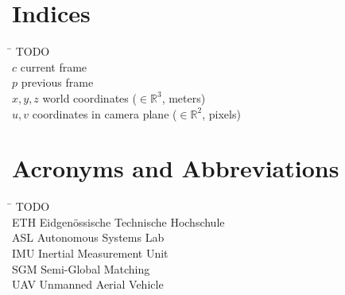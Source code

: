\section*{Indices}
\begin{tabbing}
 \hspace*{1.6cm}  \= \kill
 TODO \\
 $c$ \> current frame \\[0.5ex]
 $p$ \> previous frame \\[0.5ex]
 $x, y, z$ \> world coordinates ($\in \mathbb{R}^3$, \unit{meters}) \\[0.5ex]
 $u, v$ \> coordinates in camera plane ($\in \mathbb{R}^2$, \unit{pixels}) \\[0.5ex]

\end{tabbing}

\section*{Acronyms and Abbreviations}
\begin{tabbing}
 \hspace*{1.6cm}  \= \kill
 TODO \\
 ETH \> Eidgenössische Technische Hochschule \\[0.5ex]
 ASL \> Autonomous Systems Lab \\[0.5ex]
 IMU \> Inertial Measurement Unit \\[0.5ex]
 SGM \> Semi-Global Matching \\[0.5ex]

 UAV \> Unmanned Aerial Vehicle \\[0.5ex]
\end{tabbing}
